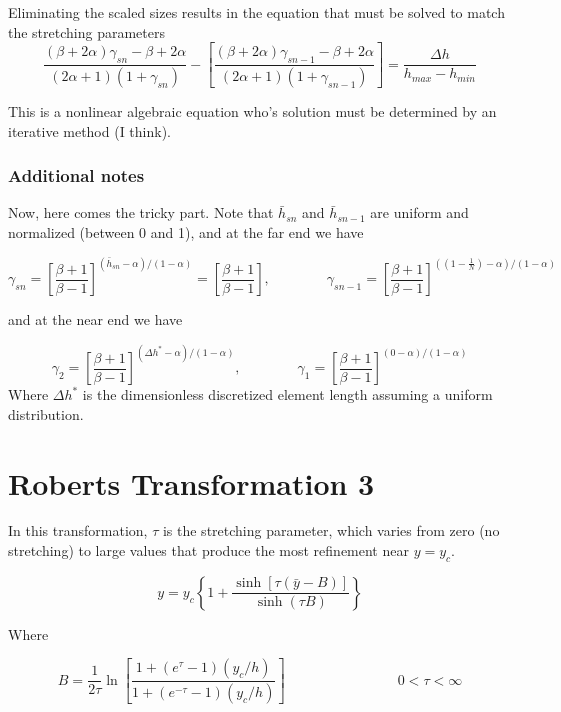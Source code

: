 \documentclass[11pt]{article}
\begin{document}
Eliminating the scaled sizes results in the equation that must be solved to match the stretching parameters
\begin{equation}
	\boxed{
	\frac{(\beta+2\alpha)\gamma_{sn} - \beta + 2\alpha}{(2\alpha+1)(1+\gamma_{sn})}
	-
	\left[
	\frac{(\beta+2\alpha)\gamma_{sn-1} - \beta + 2\alpha}{(2\alpha+1)(1+\gamma_{sn-1})}
	\right]
	=
	\frac{\Delta h}{h_{max}-h_{min}}
	}
\end{equation}

This is a nonlinear algebraic equation who's solution must be determined by an iterative method (I think).

\subsubsection{Additional notes}
Now, here comes the tricky part.
Note that $\bar{h}_{sn}$ and $\bar{h}_{sn-1}$ are uniform and normalized (between 0 and 1), and at the far end we have

\begin{equation}
	\gamma_{sn} = \left[ 
	\frac{\beta+1}{\beta-1}
	\right]^{(\bar{h}_{sn}-\alpha)/(1-\alpha)} = 
	\left[ 
	\frac{\beta+1}{\beta-1}
	\right]
	, \qquad \qquad
	\gamma_{sn-1} = \left[ 
	\frac{\beta+1}{\beta-1}
	\right]^{((1 - \frac{1}{N})-\alpha)/(1-\alpha)}
\end{equation}

and at the near end we have

\begin{equation}
	\gamma_{2} = \left[ 
	\frac{\beta+1}{\beta-1}
	\right]^{(\Delta h^*-\alpha)/(1-\alpha)}
	, \qquad \qquad
	\gamma_{1} = \left[ 
	\frac{\beta+1}{\beta-1}
	\right]^{(0-\alpha)/(1-\alpha)}
\end{equation}
Where $\Delta h^*$ is the dimensionless discretized element length assuming a uniform distribution.

\section{Roberts Transformation 3}
In this transformation, $\tau$ is the stretching parameter, which varies from zero (no stretching) to large values that produce the most refinement near $y=y_c$.

\begin{equation}
	y
	=
	y_c
	\left\{
	1
	+
	\frac{\sinh[\tau (\bar{y}-B)]}
	{\sinh(\tau B)}
	\right\}
\end{equation}

Where

\begin{equation}
	B
	=
	\frac{1}{2\tau}
	\ln 
	\left[
	\frac{1+(e^\tau-1) (y_c/h)}{1+(e^{-\tau}-1) (y_c/h)}
	\right]
	\qquad \qquad \qquad \qquad
	0 <\tau < \infty
\end{equation}




\end{document}
